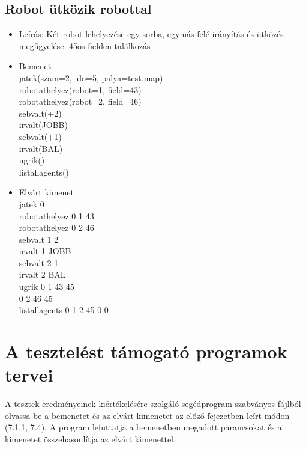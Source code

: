 \subsection{Robot ütközik robottal}
\begin{itemize}
	\item Leírás: Két robot lehelyezése egy sorba, egymás felé irányítás és ütközés megfigyelése. 45ös fielden találkozás
	\item Bemenet\\
		jatek(szam=2, ido=5, palya=test.map) \\
		robotathelyez(robot=1, field=43) \\
		robotathelyez(robot=2, field=46) \\	
		sebvalt(+2) \\
		irvalt(JOBB) \\
		sebvalt(+1) \\
		irvalt(BAL) \\
		ugrik() \\
		listallagents() \\
	\item Elvárt kimenet\\
		jatek 0 \\ 
		robotathelyez 0 1 43 \\		
		robotathelyez 0 2 46 \\		
		sebvalt 1 2 \\
		irvalt 1 JOBB \\
		sebvalt 2 1 \\
		irvalt 2 BAL \\		
		ugrik 0 1 43 45 \\ 
	  		  0 2 46 45 \\ 
		listallagents 0 1 2 45 0 0 \\
\end{itemize}

\section{A tesztelést támogató programok tervei}

A tesztek eredményeinek kiértékelésére szolgáló segédprogram szabványos fájlból olvassa be a bemenetet és az elvárt kimenetet az előző fejezetben leírt módon (7.1.1, 7.4). A program lefuttatja a bemenetben megadott parancsokat és a kimenetet összehasonlítja az elvárt kimenettel.
